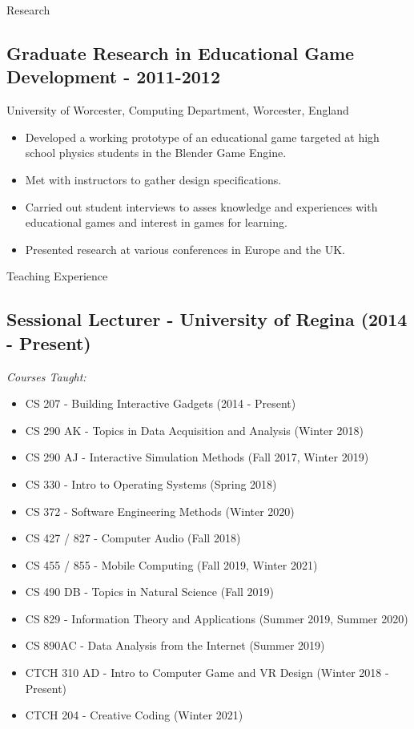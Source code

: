 \documentclass{resume} %
\begin{document}
\begin{rSection}{Research}
\subsection*{Graduate Research in Educational Game Development - 2011-2012}
University of Worcester, Computing Department, Worcester, England
\begin{itemize}
    \item Developed a working prototype of an educational game targeted at high school physics students
    in the Blender Game Engine.
    \item Met with instructors to gather design specifications.
    \item Carried out student interviews to asses knowledge and experiences with educational 
    games and interest in games for learning.
    \item Presented research at various conferences in Europe and the UK. 
\end{itemize}
\end{rSection}

\begin{rSection}{Teaching Experience}
\subsection*{Sessional Lecturer - University of Regina (2014 - Present)}
\emph{Courses Taught:}
\begin{itemize}
    \item CS 207 - Building Interactive Gadgets (2014 - Present)
    \item CS 290 AK - Topics in Data Acquisition and Analysis (Winter 2018)
    \item CS 290 AJ - Interactive Simulation Methods (Fall 2017, Winter 2019)
    \item CS 330 - Intro to Operating Systems (Spring 2018)
    \item CS 372 - Software Engineering Methods (Winter 2020)
    \item CS 427 / 827 - Computer Audio (Fall 2018)
    \item CS 455 / 855 - Mobile Computing (Fall 2019, Winter 2021)
    \item CS 490 DB - Topics in Natural Science (Fall 2019)
    \item CS 829 - Information Theory and Applications (Summer 2019, Summer 2020)
    \item CS 890AC - Data Analysis from the Internet (Summer 2019)
    \item CTCH 310 AD - Intro to Computer Game and VR Design (Winter 2018 - Present)
    \item CTCH 204 - Creative Coding (Winter 2021)
\end{itemize} 
\end{rSection}
\end{document}
